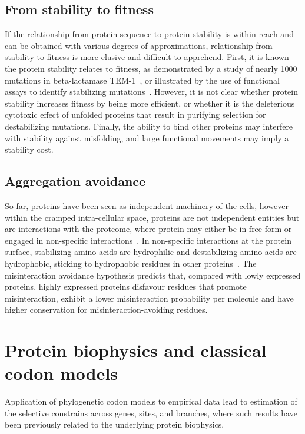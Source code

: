 \subsection{From stability to fitness}
If the relationship from protein sequence to protein stability is within reach and can be obtained with various degrees of approximations, relationship from stability to fitness is more elusive and difficult to apprehend.
First, it is known the protein stability relates to fitness, as demonstrated by a study of nearly 1000 mutations in beta-lactamase TEM-1~\citep{Jacquier2013}, or illustrated by the use of functional assays to identify stabilizing mutations~\citep{Araya2012}.
However, it is not clear whether protein stability increases fitness by being more efficient, or whether it is the deleterious cytotoxic effect of unfolded proteins that result in purifying selection for destabilizing mutations.
Finally, the ability to bind other proteins may interfere with stability against misfolding, and large functional movements may imply a stability cost.

\subsection{Aggregation avoidance}

So far, proteins have been seen as independent machinery of the cells, however within the cramped intra-cellular space, proteins are not independent entities but are interactions with the proteome, where protein may either be in free form or engaged in non-specific interactions~\citep{Yang2012, Zhang2013}.
In non-specific interactions at the protein surface, stabilizing amino-acids are hydrophilic and destabilizing amino-acids are hydrophobic, sticking to hydrophobic residues in other proteins~\citep{Dixit2013,Manhart2015}.
The misinteraction avoidance hypothesis predicts that, compared with lowly expressed proteins, highly expressed proteins disfavour residues that promote misinteraction, exhibit a lower misinteraction probability per molecule and have higher conservation for misinteraction-avoiding residues.


\section{Protein biophysics and classical codon models}

Application of phylogenetic codon models to empirical data lead to estimation of the selective constrains across genes, sites, and branches, where such results have been previously related to the underlying protein biophysics.

